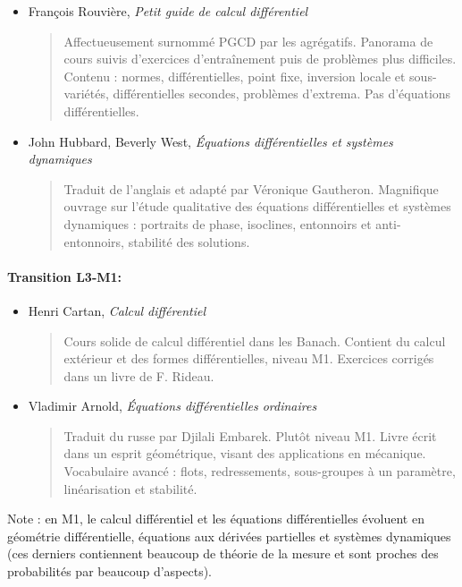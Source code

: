 \documentclass{article}
\begin{document}
\begin{mdframed}
\begin{itemize}
\item François Rouvière, \emph{Petit guide de calcul différentiel}
\begin{quote}
Affectueusement surnommé \og PGCD\fg{} par les agrégatifs. Panorama de cours suivis d'exercices d'entraînement puis de problèmes plus difficiles.
Contenu : normes, différentielles, point fixe, inversion locale et sous-variétés, différentielles secondes, problèmes d'extrema. Pas d'équations différentielles.
\end{quote}
\end{itemize}
\end{mdframed}
\begin{itemize}
\item John Hubbard, Beverly West, \emph{Équations différentielles et systèmes dynamiques}
\begin{quote}
Traduit de l'anglais et adapté par Véronique Gautheron. Magnifique ouvrage sur l'étude qualitative des équations différentielles et systèmes dynamiques : portraits de phase, isoclines, entonnoirs et anti-entonnoirs, stabilité des solutions.
\end{quote}
\end{itemize}

\paragraph{Transition L3-M1:}
\begin{itemize}
\item Henri Cartan, \emph{Calcul différentiel}
\begin{quote}
Cours solide de calcul différentiel dans les Banach. Contient du calcul extérieur et des formes différentielles, niveau M1. Exercices corrigés dans un livre de F. Rideau.
\end{quote}
\item Vladimir Arnold, \emph{Équations différentielles ordinaires}
\begin{quote}
Traduit du russe par Djilali Embarek. Plutôt niveau M1. Livre écrit dans un esprit géométrique, visant des applications en mécanique. Vocabulaire avancé : flots, redressements, sous-groupes à un paramètre, linéarisation et stabilité.
\end{quote}
\end{itemize}

Note : en M1, le calcul différentiel et les équations différentielles évoluent en géométrie différentielle, équations aux dérivées partielles et systèmes dynamiques (ces derniers contiennent beaucoup de théorie de la mesure et sont proches des probabilités par beaucoup d'aspects).
\end{document}
